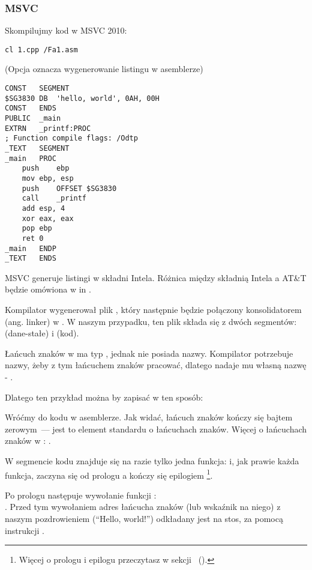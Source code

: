 \subsubsection{MSVC}

Skompilujmy kod w MSVC 2010:

\begin{lstlisting}
cl 1.cpp /Fa1.asm
\end{lstlisting}

(Opcja  oznacza wygenerowanie listingu w asemblerze)

\begin{lstlisting}[caption=MSVC 2010,style=customasmx86]
CONST	SEGMENT
$SG3830	DB	'hello, world', 0AH, 00H
CONST	ENDS
PUBLIC	_main
EXTRN	_printf:PROC
; Function compile flags: /Odtp
_TEXT	SEGMENT
_main	PROC
	push	ebp
	mov	ebp, esp
	push	OFFSET $SG3830
	call	_printf
	add	esp, 4
	xor	eax, eax
	pop	ebp
	ret	0
_main	ENDP
_TEXT	ENDS
\end{lstlisting}

MSVC generuje listingi w składni Intela.
Różnica między składnią Intela a AT\&T będzie omówiona w in .

Kompilator wygenerował plik , który następnie będzie połączony konsolidatorem (ang. linker) w .
W naszym przypadku, ten plik składa się z dwóch segmentów:  (dane-stałe) i  (kod).

\label{string_is_const_char}
Łańcuch znaków  w \CCpp ma typ , jednak nie posiada nazwy.
Kompilator potrzebuje nazwy, żeby z tym łańcuchem znaków pracować, dlatego nadaje mu własną nazwę -  .

Dlatego ten przykład można by zapisać w ten sposób:



Wróćmy do kodu w asemblerze. Jak widać, łańcuch znaków kończy się bajtem zerowym~--- jest to element standardu \CCpp o łańcuchach znaków.
Więcej o łańcuchach znaków w \CCpp: .

W segmencie kodu  znajduje się na razie tylko jedna funkcja: \main{} i, jak prawie każda funkcja, zaczyna się od prologu a kończy się epilogiem
\footnote{Więcej o prologu i epilogu przeczytasz w sekcji ~().}.

Po prologu następuje wywołanie funkcji \printf{}:\\
.
Przed tym wywołaniem adres łańcucha znaków (lub wskaźnik na niego) z naszym pozdrowieniem (``Hello, world!'') odkładany jest na stos, za pomocą instrukcji \PUSH.

